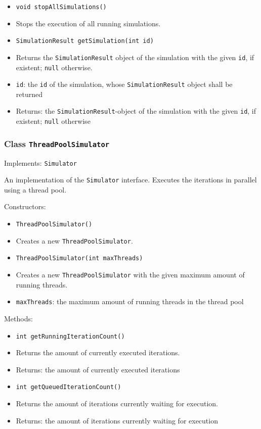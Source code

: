 \documentclass[parskip=full,11pt]{scrartcl}
\begin{document}
\begin{itemize}
	\item \texttt{void stopAllSimulations()}
	\item[] Stops the execution of all running simulations.

	\item \texttt{SimulationResult getSimulation(int id)}
	\item[] Returns the \texttt{SimulationResult} object of the simulation with the given \texttt{id}, if existent; \texttt{null} otherwise.
	\item[] \texttt{id}: the \texttt{id} of the simulation, whose \texttt{SimulationResult} object shall be returned
	\item[] Returns: the \texttt{SimulationResult}-object of the simulation with the given \texttt{id}, if existent; \texttt{null} otherwise
\end{itemize}

\subsubsection{Class \texttt{ThreadPoolSimulator}}
Implements: \texttt{Simulator}

An implementation of the \texttt{Simulator} interface. Executes the iterations in parallel using a thread pool.

Constructors:
\begin{itemize}\itemsep -10pt
\item \texttt{ThreadPoolSimulator()}
\item[] Creates a new \texttt{ThreadPoolSimulator}.

\item \texttt{ThreadPoolSimulator(int maxThreads)}
\item[] Creates a new \texttt{ThreadPoolSimulator} with the given maximum amount of running threads.
\item[] \texttt{maxThreads}: the maximum amount of running threads in the thread pool
\end{itemize}

Methods:
\begin{itemize}\itemsep -10pt
\item \texttt{int getRunningIterationCount()}
\item[] Returns the amount of currently executed iterations.
\item[] Returns: the amount of currently executed iterations

\item \texttt{int getQueuedIterationCount()}
\item[] Returns the amount of iterations currently waiting for execution.
\item[] Returns: the amount of iterations currently waiting for execution
\end{itemize}
\end{document}
